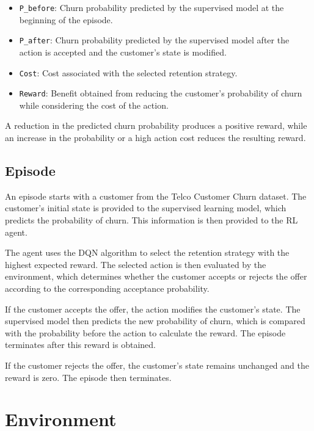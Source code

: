 \documentclass{article}
\begin{document}
\begin{itemize}

\item \texttt{P\_before}: Churn probability predicted by the supervised model at the beginning
of the episode.

\item \texttt{P\_after}: Churn probability predicted by the supervised model after the action
is accepted and the customer's state is modified.

\item \texttt{Cost}: Cost associated with the selected retention strategy.

\item \texttt{Reward}: Benefit obtained from reducing the customer's probability of churn while
considering the cost of the action.

\end{itemize}

A reduction in the predicted churn probability produces a positive reward, while an increase in
the probability or a high action cost reduces the resulting reward.

\subsection{Episode }

An episode starts with a customer from the Telco Customer Churn dataset. The customer's initial
state is provided to the supervised learning model, which predicts the probability of churn.
This information is then provided to the RL agent.

The agent uses the DQN algorithm to select the retention strategy with the highest expected reward.
The selected action is then evaluated by the environment, which determines whether the customer
accepts or rejects the offer according to the corresponding acceptance probability.

If the customer accepts the offer, the action modifies the customer's state. The supervised model
then predicts the new probability of churn, which is compared with the probability before the action
to calculate the reward. The episode terminates after this reward is obtained.

If the customer rejects the offer, the customer's state remains unchanged and the reward is zero.
The episode then terminates.


\section{Environment}
\end{document}

